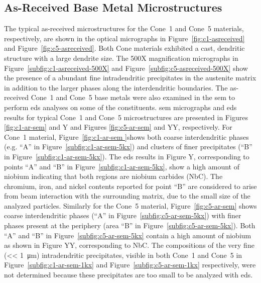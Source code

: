 \subsection{As-Received Base Metal Microstructures}
The typical as-received microstructures for the Cone~1 and Cone~5 materials, respectively, are shown in the optical micrographs in Figure~\ref{fig:c1-asreceived} and Figure~\ref{fig:c5-asreceived}.  Both Cone materials exhibited a cast, dendritic structure with a large dendrite size.  The 500X magnification micrographs in Figure~\ref{subfig:c1-asreceived-500X} and Figure~\ref{subfig:c5-asreceived-500X} show the presence of a abundant fine intradendritic precipitates in the austenite matrix in addition to the larger phases along the interdendritic boundaries. The as-received Cone~1 and Cone~5 base metals were also examined in the \gls{sem} to perform \gls{eds} analyses on some of the constituents. \Gls{sem} micrographs and \gls{eds} results for typical Cone~1 and Cone~5 microstructures are presented in Figures \ref{fig:c1-ar-sem} and Y and Figures \ref{fig:c5-ar-sem} and YY, respectively. For Cone~1 material, Figure~\ref{fig:c1-ar-sem }shows both coarse interdendritic phases (e.g. ``A'' in Figure~\ref{subfig:c1-ar-sem-5kx}) and clusters of finer precipitates (``B'' in Figure~\ref{subfig:c1-ar-sem-5kx}). The \gls{eds} results in Figure Y, corresponding to points ``A'' and ``B'' in Figure~\ref{subfig:c1-ar-sem-5kx}, show a high amount of niobium indicating that both regions are niobium carbides (NbC). The chromium, iron, and nickel contents reported for point ``B'' are considered to arise from beam interaction with the surrounding matrix, due to the small size of the analyzed particles. Similarly for the Cone~5 material, Figure~\ref{fig:c5-ar-sem} shows coarse interdendritic phases (``A'' in Figure~\ref{subfig:c5-ar-sem-5kx}) with finer phases present at the periphery (area ``B'' in Figure~\ref{subfig:c5-ar-sem-5kx}). Both ``A'' and ``B'' in Figure~\ref{subfig:c5-ar-sem-5kx} contain a high amount of niobium as shown in Figure YY, corresponding to NbC. The compositions of the very fine (<< \SI{1}{\micro\meter}) intradendritic precipitates, visible in both Cone~1 and Cone~5 in Figure~\ref{subfig:c1-ar-sem-1kx} and Figure~\ref{subfig:c5-ar-sem-1kx} respectively, were not determined because these precipitates are too small to be analyzed with \gls{eds}. 

